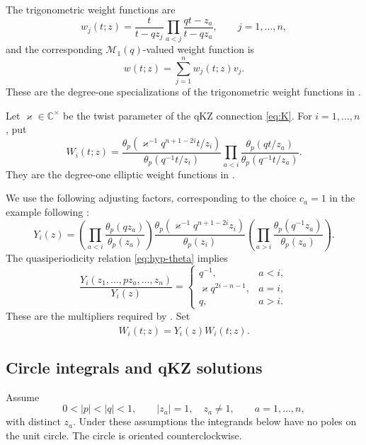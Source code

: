 \documentclass[12pt]{amsart}
\theoremstyle{definition}
\numberwithin{equation}{section}
\theoremstyle{definition}
\let\mc\mathcal
\let\tht\theta
\def\C{{\mathbb C}}
\def\beq{\begin{equation}}
\def\eeq{\end{equation}}
\begin{document}
The trigonometric weight functions are
\beq\label{eq:hyp-wj}
 w_j(t;z)=\frac{t}{t-qz_j}
 \prod_{a<j}\frac{qt-z_a}{t-qz_a},
 \qquad j=1,\ldots,n,
\eeq
and the corresponding $\mc M_1(q)$-valued weight function is
\beq\label{eq:hyp-w}
 w(t;z)=\sum_{j=1}^n w_j(t;z)v_j.
\eeq
These are the degree-one specializations of the trigonometric
weight functions in \cite[(2.20)]{TV97}.

Let $\varkappa\in\C^\times$ be the twist parameter of the qKZ
connection \eqref{eq:K}. For $i=1,\ldots,n$, put
\beq\label{eq:hyp-Wi}
 W_i(t;z)=
 \frac{\tht_p(\varkappa^{-1}q^{n+1-2i}t/z_i)}
      {\tht_p(q^{-1}t/z_i)}
 \prod_{a<i}
 \frac{\tht_p(qt/z_a)}{\tht_p(q^{-1}t/z_a)}.
\eeq
They are the degree-one elliptic weight functions in
\cite[(2.30)]{TV97}.

We use the following adjusting factors, corresponding to the choice
$c_a=1$ in the example following \cite[(2.32)]{TV97}:
\beq\label{eq:hyp-Yi}
 Y_i(z)=
 \left(\prod_{a<i}\frac{\tht_p(qz_a)}{\tht_p(z_a)}\right)
 \frac{\tht_p(\varkappa^{-1}q^{n+1-2i}z_i)}
      {\tht_p(z_i)}
 \left(\prod_{a>i}\frac{\tht_p(q^{-1}z_a)}{\tht_p(z_a)}\right).
\eeq
The quasiperiodicity relation \eqref{eq:hyp-theta} implies
\beq\label{eq:hyp-Ytransform}
 \frac{Y_i(z_1,\ldots,pz_a,\ldots,z_n)}{Y_i(z)}
 =\begin{cases}
 q^{-1},&a<i,\\
 \varkappa q^{2i-n-1},&a=i,\\
 q,&a>i.
 \end{cases}
\eeq
These are the multipliers required by \cite[(2.32)]{TV97}.
Set
\beq\label{eq:hyp-What}
 \widehat W_i(t;z)=Y_i(z)W_i(t;z).
\eeq

\subsection{Circle integrals and qKZ solutions}
\label{subsec:hyp-circle-integrals}

Assume
\beq\label{eq:hyp-circle-domain}
 0<|p|<|q|<1,\qquad |z_a|=1,\quad z_a\ne1,
 \qquad a=1,\ldots,n,
\eeq
with distinct $z_a$.  Under these assumptions the integrands below
have no poles on the unit circle.  The circle is oriented
counterclockwise.
\end{document}
